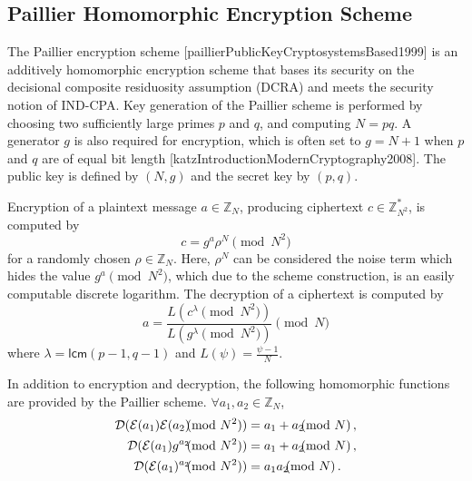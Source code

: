 \subsection{Paillier Homomorphic Encryption Scheme}
The Paillier encryption scheme [paillierPublicKeyCryptosystemsBased1999] is an additively homomorphic encryption scheme that bases its security on the decisional composite residuosity assumption (DCRA) and meets the security notion of IND-CPA. Key generation of the Paillier scheme is performed by choosing two sufficiently large primes $p$ and $q$, and computing $N=pq$. A generator $g$ is also required for encryption, which is often set to $g=N+1$ when $p$ and $q$ are of equal bit length [katzIntroductionModernCryptography2008]. The public key is defined by $(N, g)$ and the secret key by $(p, q)$.

Encryption of a plaintext message $a \in \mathbb{Z}_N$, producing ciphertext $c \in \mathbb{Z}^{*}_{N^2}$, is computed by
\begin{equation}
    c = g^a \rho^N \pmod{N^2}
\end{equation}
for a randomly chosen $\rho \in \mathbb{Z}_{N}$. Here, $\rho^N$ can be considered the noise term which hides the value $g^a \pmod{N^2}$, which due to the scheme construction, is an easily computable discrete logarithm. The decryption of a ciphertext is computed by
\begin{equation}
    a = \frac{L(c^\lambda\pmod{N^2})}{L(g^\lambda\pmod{N^2})} \pmod{N}
\end{equation}
where $\lambda = \mathsf{lcm}(p-1, q-1)$ and $L(\psi) = \frac{\psi-1}{N}$.

In addition to encryption and decryption, the following homomorphic functions are provided by the Paillier scheme. $\forall a_1,a_2 \in \mathbb{Z}_N$,
\begin{align}
    \mathcal{D}(\mathcal{E}(a_1)\mathcal{E}(a_2) \hspace{-7pt} \pmod{N^2}) &= a_1+a_2 \hspace{-7pt} \pmod{N}\,, \label{eqn:paillier_hom_add}\\
    \mathcal{D}(\mathcal{E}(a_1)g^{a_2} \hspace{-7pt} \pmod{N^2}) &= a_1+a_2\hspace{-7pt}\pmod{N}\,, \label{eqn:paillier_hom_plain_add}\\
    \mathcal{D}(\mathcal{E}(a_1)^{a_2} \hspace{-7pt} \pmod{N^2}) &= a_1a_2 \hspace{-7pt} \pmod{N}\,. \label{eqn:paillier_hom_mult}
\end{align}


